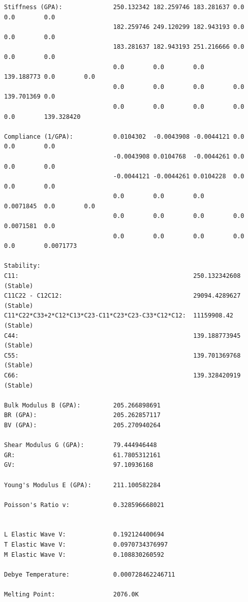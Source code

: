 \documentclass[12pt,twoside]{manual}
\begin{document}
\begin{appendices}
\begin{lstlisting}[style=inputfile,caption={Results File}]
Stiffness (GPA):              250.132342 182.259746 183.281637 0.0        0.0        0.0       
                              182.259746 249.120299 182.943193 0.0        0.0        0.0       
                              183.281637 182.943193 251.216666 0.0        0.0        0.0       
                              0.0        0.0        0.0        139.188773 0.0        0.0       
                              0.0        0.0        0.0        0.0        139.701369 0.0       
                              0.0        0.0        0.0        0.0        0.0        139.328420

Compliance (1/GPA):           0.0104302  -0.0043908 -0.0044121 0.0        0.0        0.0       
                              -0.0043908 0.0104768  -0.0044261 0.0        0.0        0.0       
                              -0.0044121 -0.0044261 0.0104228  0.0        0.0        0.0       
                              0.0        0.0        0.0        0.0071845  0.0        0.0       
                              0.0        0.0        0.0        0.0        0.0071581  0.0       
                              0.0        0.0        0.0        0.0        0.0        0.0071773 

Stability:
C11:                                                250.132342608 (Stable)
C11C22 - C12C12:                                    29094.4289627 (Stable)
C11*C22*C33+2*C12*C13*C23-C11*C23*C23-C33*C12*C12:  11159908.42 (Stable)
C44:                                                139.188773945 (Stable)
C55:                                                139.701369768 (Stable)
C66:                                                139.328420919 (Stable)

Bulk Modulus B (GPA):         205.266898691
BR (GPA):                     205.262857117
BV (GPA):                     205.270940264

Shear Modulus G (GPA):        79.444946448
GR:                           61.7805312161
GV:                           97.10936168

Young's Modulus E (GPA):      211.100582284

Poisson's Ratio v:            0.328596668021


L Elastic Wave V:             0.192124400694
T Elastic Wave V:             0.0970734376997
M Elastic Wave V:             0.108830260592

Debye Temperature:            0.000728462246711

Melting Point:                2076.0K 









\end{lstlisting}
\end{appendices}
\end{document}
